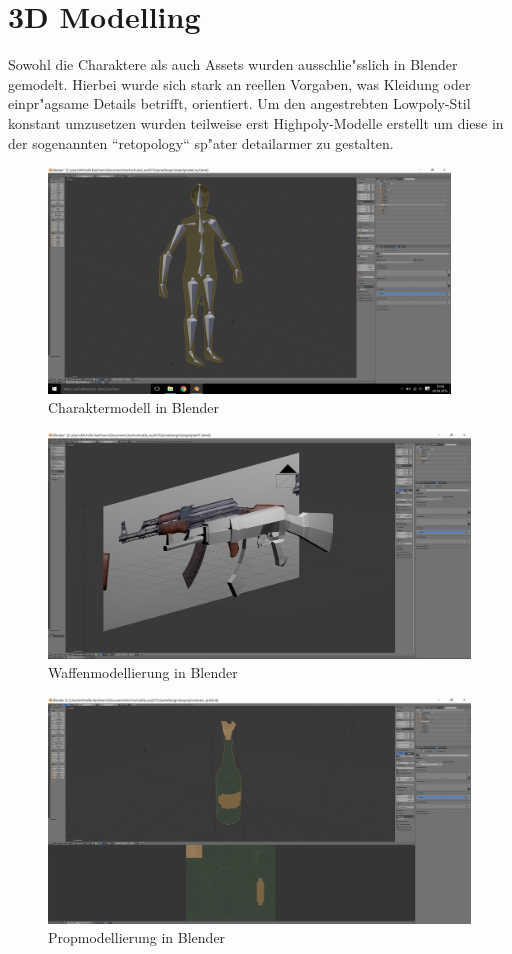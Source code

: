 \chapter{3D Modelling}
Sowohl die Charaktere als auch Assets wurden ausschlie"sslich in Blender gemodelt. Hierbei wurde sich stark an reellen Vorgaben, was Kleidung oder einpr"agsame Details betrifft, orientiert. Um den angestrebten Lowpoly-Stil konstant umzusetzen wurden teilweise erst Highpoly-Modelle erstellt um diese in der sogenannten ``retopology`` sp"ater detailarmer zu gestalten.

\begin{figure}
	\centering
	\includegraphics[height=6cm]{images/screenshot3.png}
	\caption{Charaktermodell in Blender}
	\label{fig:charmodell}
\end{figure}

\begin{figure}
	\centering
	\includegraphics[height=6cm]{images/screenshot2.png}
	\caption{Waffenmodellierung in Blender}
	\label{fig:akmodel}
\end{figure}

\begin{figure}
	\centering
	\includegraphics[height=6cm]{images/screenshot4.png}
	\caption{Propmodellierung in Blender}
	\label{fig:molotovmodel}
\end{figure}

